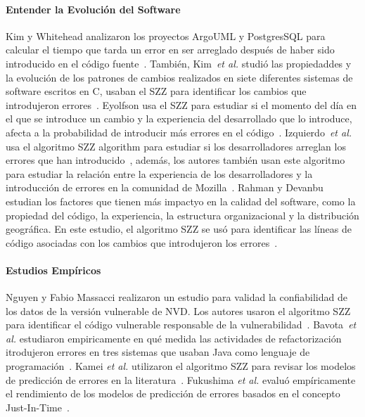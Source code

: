 \documentclass[a4paper, 12pt]{book}
\begin{document}
\paragraph{Entender la Evoluci\'on del Software}
Kim y Whitehead analizaron los proyectos ArgoUML y PostgresSQL para calcular el tiempo que tarda un error en ser arreglado despu\'es de haber sido introducido en el c\'odigo fuente~\cite{kim2006long}. Tambi\'en, Kim~\textit{et al.} studi\'o las propiedaddes y la evoluci\'on de los patrones de cambios realizados en siete diferentes sistemas de software escritos en C, usaban el SZZ para identificar los cambios que introdujeron errores~\cite{kim2006properties}. Eyolfson usa el SZZ para estudiar si el momento del d\'ia en el que se introduce un cambio y la experiencia del desarrollado que lo introduce, afecta a la probabilidad de introducir m\'as errores en el c\'odigo~\cite{kamei2010revisiting}. Izquierdo~\textit{et al.} usa el algoritmo SZZ algorithm para estudiar si los desarrolladores arreglan los errores que han introducido~\cite{izquierdo2011developers}, adem\'as, los autores tambi\'en usan este algoritmo para estudiar la relaci\'on entre la experiencia de los desarrolladores y la introducci\'on de errores en la comunidad de Mozilla~\cite{izquierdo2012more}. Rahman y Devanbu estudian los factores que tienen m\'as impactyo en la calidad del software, como la propiedad del c\'odigo, la experiencia, la estructura organizacional y la distribuci\'on geogr\'afica. En este estudio, el algoritmo SZZ se us\'o para identificar las l\'ineas de c\'odigo asociadas con los cambios que introdujeron los errores~\cite{rahman2011ownership}.

\paragraph{Estudios Emp\'iricos}
Nguyen y Fabio Massacci realizaron un estudio para validad la confiabilidad de los datos de la versi\'on vulnerable de NVD. Los autores usaron el algoritmo SZZ para identificar el c\'odigo vulnerable responsable de la vulnerabilidad~\cite{nguyen2013reliability}. Bavota~\textit{et al.} estudiaron empiricamente en qu\'e medida las actividades de refactorizaci\'on itrodujeron errores en tres sistemas que usaban Java como lenguaje de programaci\'on~\cite{bavota2012does}. Kamei \emph{et al.} utilizaron el algoritmo SZZ para revisar los modelos de predicci\'on de errores en la literatura~\cite{kamei2010revisiting}. Fukushima \emph{et al.} evalu\'o emp\'iricamente el rendimiento de los modelos de predicci\'on de errores basados en el concepto Just-In-Time~\cite{fukushima2014empirical}.
\end{document}
